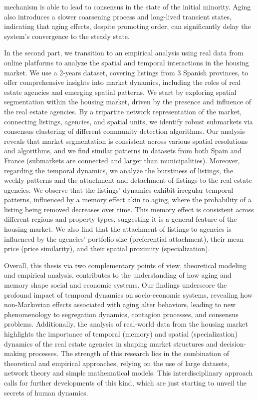 mechanism is able to lead to consensus in the state of the initial minority. Aging also introduces a slower coarsening process and long-lived transient states, indicating that aging effects, despite promoting order, can significantly delay the system's convergence to the steady state.

In the second part, we transition to an empirical analysis using real data from online platforms to analyze the spatial and temporal interactions in the housing market. We use a 2-years dataset, covering listings from 3 Spanish provinces, to offer comprehensive insights into market dynamics, including the roles of real estate agencies and emerging spatial patterns. We start by exploring spatial segmentation within the housing market, driven by the presence and influence of the real estate agencies. By a tripartite network representation of the market, connecting listings, agencies, and spatial units, we identify robust submarkets via consensus clustering of different community detection algorithms. Our analysis reveals that market segmentation is consistent across various spatial resolutions and algorithms, and we find similar patterns in datasets from both Spain and France (submarkets are connected and larger than municipalities). Moreover, regarding the temporal dynamics, we analyze the burstiness of listings, the weekly patterns and the attachment and detachment of listings to the real estate agencies. We observe that the listings' dynamics exhibit irregular temporal patterns, influenced by a memory effect akin to aging, where the probability of a listing being removed decreases over time. This memory effect is consistent across different regions and property types, suggesting it is a general feature of the housing market. We also find that the attachment of listings to agencies is influenced by the agencies' portfolio size (preferential attachment), their mean price (price similarity), and their spatial proximity (specialization).

\thispagestyle{empty}

Overall, this thesis via two complementary points of view, theoretical modeling and empirical analysis, contributes to the understanding of how aging and memory shape social and economic systems. Our findings underscore the profound impact of temporal dynamics on socio-economic systems, revealing how non-Markovian effects associated with aging alter behaviors, leading to new phenomenology to segregation dynamics, contagion processes, and consensus problems. Additionally, the analysis of real-world data from the housing market highlights the importance of temporal (memory) and spatial (specialization) dynamics of the real estate agencies in shaping market structures and decision-making processes. The strength of this research lies in the combination of theoretical and empirical approaches, relying on the use of large datasets, network theory and simple mathematical models. This interdisciplinary approach calls for further developments of this kind, which are just starting to unveil the secrets of human dynamics.

\vfill